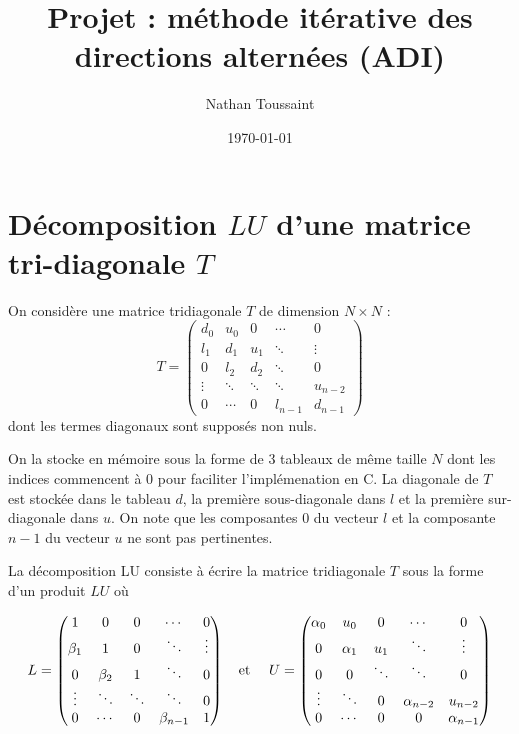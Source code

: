 \documentclass{article}
\begin{document}
 \title{Projet : méthode itérative des directions alternées (ADI)}

\author{Nathan Toussaint }
\date{\today}
 
 \maketitle
 
 
\section{Décomposition $LU$ d'une matrice tri-diagonale $T$}

On considère une matrice tridiagonale $T$ de dimension $N \times N$ :
\begin{equation}
T = \begin{pmatrix}
    d_0 & u_0 & 0 & \cdots & 0 \\
    l_1 & d_1 & u_1 & \ddots & \vdots \\
    0 & l_2 & d_2 & \ddots & 0 \\
    \vdots & \ddots & \ddots & \ddots & u_{n-2} \\
    0 & \cdots & 0 & l_{n-1} & d_{n-1}
\end{pmatrix}
\end{equation}
dont les termes diagonaux sont supposés non nuls.

On la stocke en mémoire sous la forme de 3 tableaux de même taille $N$ dont 
les indices commencent à 0 pour faciliter l'implémenation en C.
La diagonale de $T$ est stockée dans le tableau $d$, la première sous-diagonale dans $l$
et la première sur-diagonale dans $u$. On note que les composantes $0$ du vecteur $l$ et la composante $n-1$ du vecteur $u$ ne sont pas pertinentes.

La décomposition LU consiste à écrire la matrice tridiagonale $T$ sous la forme d'un produit $LU$ où

\begin{equation}
L = \begin{pmatrix}
    1 & 0 & 0 & \cdots & 0 \\
    \beta_1 & 1 & 0 & \ddots & \vdots \\
    0 & \beta_2 & 1 & \ddots & 0 \\
    \vdots & \ddots & \ddots & \ddots & 0 \\
    0 & \cdots & 0 & \beta_{n-1} & 1
\end{pmatrix}
\text{\quad et \quad}
U = \begin{pmatrix}
    \alpha_0 & u_0 & 0 & \cdots & 0 \\
    0  & \alpha_1 & u_1 & \ddots & \vdots \\
    0 & 0 &  \ddots & \ddots & 0 \\
    \vdots & \ddots & 0  &\alpha_{n-2} & u_{n-2} \\
    0 & \cdots & 0 & 0 & \alpha_{n-1}
\end{pmatrix}
\end{equation}
\end{document}
